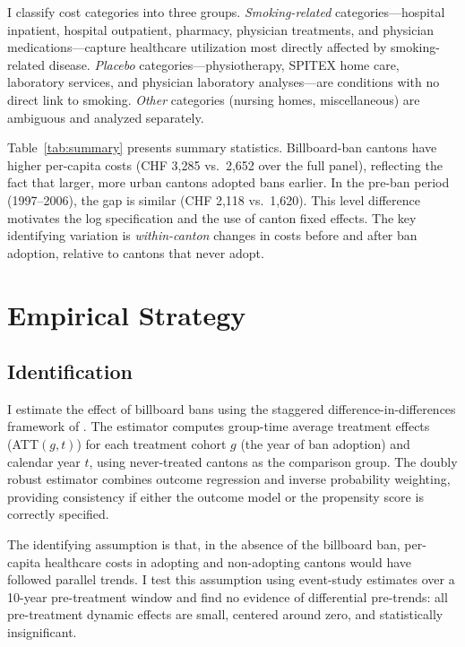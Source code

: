 \documentclass[12pt]{article}
\begin{document}
I classify cost categories into three groups. \textit{Smoking-related} categories---hospital inpatient, hospital outpatient, pharmacy, physician treatments, and physician medications---capture healthcare utilization most directly affected by smoking-related disease. \textit{Placebo} categories---physiotherapy, SPITEX home care, laboratory services, and physician laboratory analyses---are conditions with no direct link to smoking. \textit{Other} categories (nursing homes, miscellaneous) are ambiguous and analyzed separately.



Table~\ref{tab:summary} presents summary statistics. Billboard-ban cantons have higher per-capita costs (CHF 3,285 vs.\ 2,652 over the full panel), reflecting the fact that larger, more urban cantons adopted bans earlier. In the pre-ban period (1997--2006), the gap is similar (CHF 2,118 vs.\ 1,620). This level difference motivates the log specification and the use of canton fixed effects. The key identifying variation is \textit{within-canton} changes in costs before and after ban adoption, relative to cantons that never adopt.


\section{Empirical Strategy}

\subsection{Identification}

I estimate the effect of billboard bans using the staggered difference-in-differences framework of \citet{callaway2021difference}. The estimator computes group-time average treatment effects (ATT$(g,t)$) for each treatment cohort $g$ (the year of ban adoption) and calendar year $t$, using never-treated cantons as the comparison group. The doubly robust estimator combines outcome regression and inverse probability weighting, providing consistency if either the outcome model or the propensity score is correctly specified.

The identifying assumption is that, in the absence of the billboard ban, per-capita healthcare costs in adopting and non-adopting cantons would have followed parallel trends. I test this assumption using event-study estimates over a 10-year pre-treatment window and find no evidence of differential pre-trends: all pre-treatment dynamic effects are small, centered around zero, and statistically insignificant.
\end{document}
